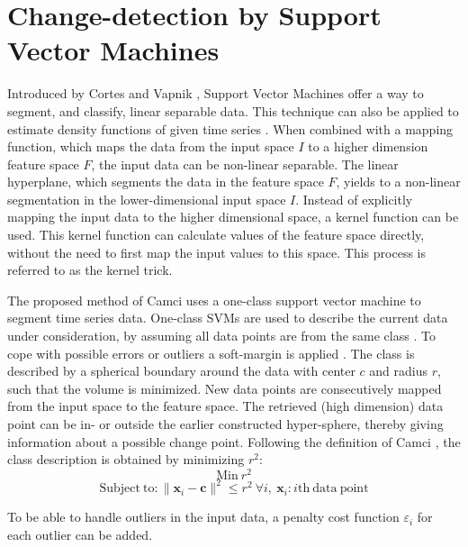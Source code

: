\section{Change-detection by Support Vector Machines}\label{svm}

Introduced by Cortes and Vapnik \cite{vapnik1998statistical, vapnik1999nature}, Support Vector Machines offer a way to segment, and classify, linear separable data.
This technique can also be applied to estimate density functions of given time series \cite{weston1999support}.
When combined with a mapping function, which maps the data from the input space $I$ to a higher dimension feature space $F$, the input data can be non-linear separable.
The linear hyperplane, which segments the data in the feature space $F$, yields to a non-linear segmentation in the lower-dimensional input space $I$.
Instead of explicitly mapping the input data to the higher dimensional space, a kernel function can be used.
This kernel function can calculate values of the feature space directly, without the need to first map the input values to this space.
This process is referred to as the kernel trick.

The proposed method of Camci \cite{camci2010change} uses a one-class support vector machine to segment time series data.
One-class SVMs are used to describe the current data under consideration, by assuming all data points are from the same class \cite{tax2001one}.
To cope with possible errors or outliers a soft-margin is applied \cite{cortes1995support}.
The class is described by a spherical boundary around the data with center $c$ and radius $r$, such that the volume is minimized.
New data points are consecutively mapped from the input space to the feature space.
The retrieved (high dimension) data point can be in- or outside the earlier constructed hyper-sphere, thereby giving information about a possible change point.
Following the definition of Camci \cite{camci2010change}, the class description is obtained by minimizing $r^2$:
\begin{equation}
  \mathrm{Min}\ r^2
\end{equation}
\begin{equation}
  \mathrm{Subject\ to} : \|\mathbf{x}_i - \mathbf{c}\|^2 \le r^2\ \forall i,\ \mathbf{x}_i : i \mathrm{th\ data\ point}
\end{equation}

To be able to handle outliers in the input data, a penalty cost function $\varepsilon_i$ for each outlier can be added.

